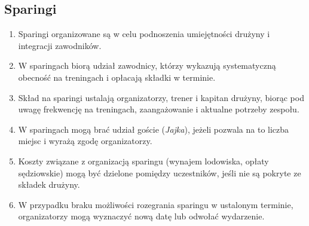 \documentclass[12pt,a4paper]{article}
\begin{document}
\subsection{Sparingi}
\begin{enumerate}
  \item Sparingi organizowane są w celu podnoszenia umiejętności drużyny i integracji zawodników.
  \item W sparingach biorą udział zawodnicy, którzy wykazują systematyczną obecność na treningach i opłacają składki w terminie.
  \item Skład na sparingi ustalają organizatorzy, trener i kapitan drużyny, biorąc pod uwagę frekwencję na treningach, zaangażowanie i aktualne potrzeby zespołu.
  \item W sparingach mogą brać udział goście (\textit{Jajka}), jeżeli pozwala na to liczba miejsc i wyrażą zgodę organizatorzy.
  \item Koszty związane z organizacją sparingu (wynajem lodowiska, opłaty sędziowskie) mogą być dzielone pomiędzy uczestników, jeśli nie są pokryte ze składek drużyny.
  \item W przypadku braku możliwości rozegrania sparingu w ustalonym terminie, organizatorzy mogą wyznaczyć nową datę lub odwołać wydarzenie.
\end{enumerate}
\end{document}
